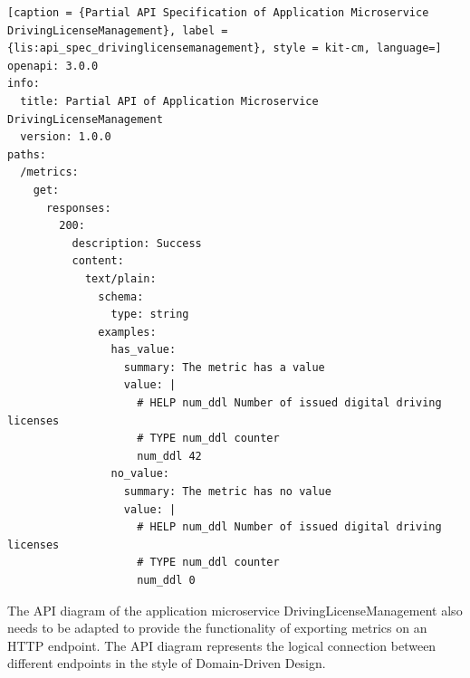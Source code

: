 \begin{lstlisting}[caption = {Partial API Specification of Application Microservice DrivingLicenseManagement}, label = {lis:api_spec_drivinglicensemanagement}, style = kit-cm, language=]
openapi: 3.0.0
info:
  title: Partial API of Application Microservice DrivingLicenseManagement
  version: 1.0.0
paths:
  /metrics:
    get:
      responses:
        200:
          description: Success
          content:
            text/plain:
              schema:
                type: string
              examples:
                has_value: 
                  summary: The metric has a value
                  value: |
                    # HELP num_ddl Number of issued digital driving licenses
                    # TYPE num_ddl counter
                    num_ddl 42
                no_value: 
                  summary: The metric has no value
                  value: |
                    # HELP num_ddl Number of issued digital driving licenses
                    # TYPE num_ddl counter
                    num_ddl 0
\end{lstlisting}

The API diagram of the application microservice DrivingLicenseManagement also needs to be adapted
to provide the functionality of exporting metrics on an HTTP endpoint. The API diagram
represents the logical connection between different endpoints in the style of Domain-Driven Design.

